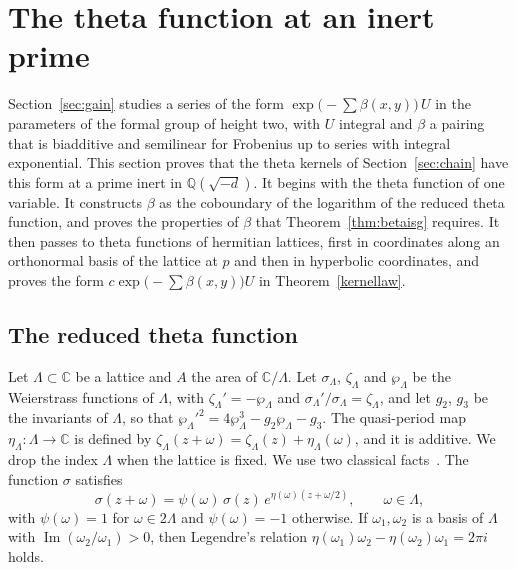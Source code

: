 \section{The theta function at an inert prime}\label{sec:inert}

Section~\ref{sec:gain} studies a series of the form $\exp\big(-\sum\beta(x,y)\big)\,U$ in the parameters of the formal group of height two, with $U$ integral and $\beta$ a pairing that is biadditive and semilinear for Frobenius up to series with integral exponential. This section proves that the theta kernels of Section~\ref{sec:chain} have this form at a prime inert in $\mathbb Q(\sqrt{-d})$. It begins with the theta function of one variable. It constructs $\beta$ as the coboundary of the logarithm of the reduced theta function, and proves the properties of $\beta$ that Theorem~\ref{thm:betaisg} requires. It then passes to theta functions of hermitian lattices, first in coordinates along an orthonormal basis of the lattice at $p$ and then in hyperbolic coordinates, and proves the form $c\exp\big(-\sum\beta(x,y)\big)U$ in Theorem~\ref{kernellaw}.

\subsection{The reduced theta function}\label{sec:reducedtheta}

Let $\Lambda\subset\mathbb C$ be a lattice and $A$ the area of $\mathbb C/\Lambda$. Let $\sigma_\Lambda$, $\zeta_\Lambda$ and $\wp_\Lambda$ be the Weierstrass functions of $\Lambda$, with $\zeta_\Lambda'=-\wp_\Lambda$ and $\sigma_\Lambda'/\sigma_\Lambda=\zeta_\Lambda$, and let $g_2$, $g_3$ be the invariants of $\Lambda$, so that $\wp_\Lambda'^2=4\wp_\Lambda^3-g_2\wp_\Lambda-g_3$. The quasi-period map $\eta_\Lambda\colon\Lambda\to\mathbb C$ is defined by $\zeta_\Lambda(z+\omega)=\zeta_\Lambda(z)+\eta_\Lambda(\omega)$, and it is additive. We drop the index $\Lambda$ when the lattice is fixed. We use two classical facts~\cite[Chapter~18]{langelliptic}. The function $\sigma$ satisfies
\begin{equation}\label{sigmaqp}
\sigma(z+\omega)=\psi(\omega)\,\sigma(z)\,e^{\eta(\omega)(z+\omega/2)},\qquad\omega\in\Lambda,
\end{equation}
with $\psi(\omega)=1$ for $\omega\in2\Lambda$ and $\psi(\omega)=-1$ otherwise. If $\omega_1,\omega_2$ is a basis of $\Lambda$ with $\operatorname{Im}(\omega_2/\omega_1)>0$, then Legendre's relation $\eta(\omega_1)\omega_2-\eta(\omega_2)\omega_1=2\pi i$ holds.

